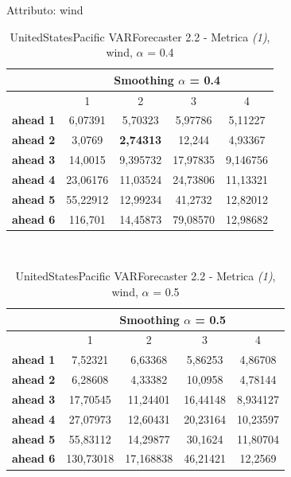 \documentclass[12pt,a4paper,oneside,openright]{book}
\begin{document}
\medskip


Attributo: wind \\ 

\begin{table}[H]
\centering
\begin{tabular}{|c|c|c|c|c|}
\hline
 & \multicolumn{4}{|c|}{Smoothing $\alpha$ = 0.4} \\
\hline
& 1 & 2 & 3 & 4 \\
\hline
\textbf{ahead 1} & 6,07391 & 5,70323 & 5,97786 & 5,11227 \\
\hline
\textbf{ahead 2} & 3,0769 & \textbf{2,74313} & 12,244 & 4,93367 \\ 
\hline
\textbf{ahead 3} & 14,0015 & 9,395732 & 17,97835 & 9,146756\\
\hline
\textbf{ahead 4} & 23,06176 & 11,03524 & 24,73806 & 11,13321\\ 
\hline
\textbf{ahead 5} & 55,22912 & 12,99234 & 41,2732 & 12,82012\\
\hline
\textbf{ahead 6} & 116,701 & 14,45873 & 79,08570 & 12,98682 \\
\hline
\end{tabular} \\
\caption{UnitedStatesPacific VARForecaster 2.2 - Metrica \textit{(1)}, wind, $\alpha$ = 0.4}
\end{table} 

\medskip

\begin{table}[H]
\centering
\begin{tabular}{|c|c|c|c|c|}
\hline
 & \multicolumn{4}{|c|}{Smoothing $\alpha$ = 0.5} \\
\hline
& 1 & 2 & 3 & 4 \\
\hline
\textbf{ahead 1} & 7,52321 & 6,63368 & 5,86253 & 4,86708 \\
\hline
\textbf{ahead 2} & 6,28608 & 4,33382 & 10,0958 & 4,78144\\ 
\hline
\textbf{ahead 3} & 17,70545 & 11,24401 & 16,44148 & 8,934127\\
\hline
\textbf{ahead 4} & 27,07973 & 12,60431 & 20,23164 & 10,23597\\ 
\hline
\textbf{ahead 5} & 55,83112 & 14,29877 & 30,1624 & 11,80704\\
\hline
\textbf{ahead 6} & 130,73018 & 17,168838 & 46,21421 & 12,2569\\ 
\hline
\end{tabular} \\
\caption{UnitedStatesPacific VARForecaster 2.2 - Metrica \textit{(1)}, wind, $\alpha$ = 0.5}
\end{table} 
\end{document}
